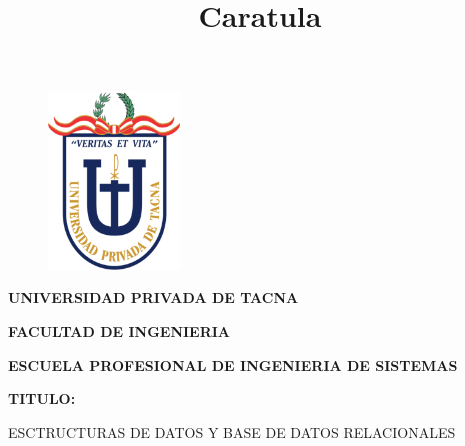 \documentclass[12pt,letterpaper]{article}
\begin{document}
%


\title{Caratula}

\begin{titlepage}
\begin{center}
\begin{figure}[htb]
\begin{center}
\includegraphics[width=3.5cm]{./img/logo}
\end{center}
\end{figure}

\vspace*{0.15in}
\begin{Large}
\textbf{UNIVERSIDAD PRIVADA DE TACNA}\\
\end{Large}

\vspace*{0.1in}
\begin{Large}
\textbf{FACULTAD DE INGENIERIA} \\
\end{Large}

\vspace*{0.1in}
\begin{Large}
\textbf{ESCUELA PROFESIONAL DE INGENIERIA DE SISTEMAS} \\
\end{Large}

\vspace*{0.3in}
\begin{Large}
\textbf{TITULO:}\\
\end{Large}

\vspace*{0.1in}
\begin{Large}
    ESCTRUCTURAS DE DATOS Y BASE DE DATOS RELACIONALES \\
\end{Large}


\end{center}
\end{titlepage}
\end{document}
